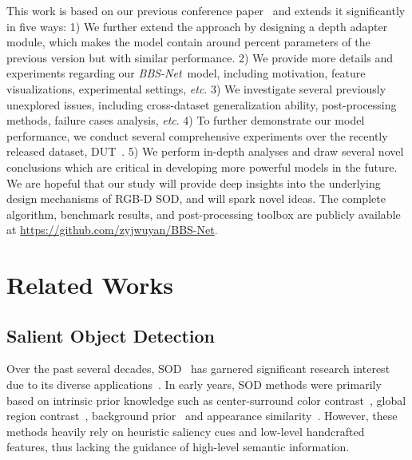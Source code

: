 \documentclass[journal]{IEEEtran}
\newcommand{\supp}[1]{\textcolor{magenta}{#1}}
\def\etc{\emph{etc}}
\def\ourmodel{\emph{BBS-Net}}
\begin{document}
This work is based on our previous conference paper~\cite{fan2020bbs} and extends it significantly in five ways:
1) We further extend the approach by designing a depth adapter module, which makes the model contain around  percent parameters of the previous version but with similar performance.
2) We provide more details and experiments regarding our \ourmodel~model, including motivation, feature visualizations, experimental settings, \etc.
3) We investigate several previously unexplored issues, including cross-dataset generalization ability, post-processing methods, failure cases analysis, \etc.
4) To further demonstrate our model performance, we conduct several comprehensive experiments over the recently released dataset, DUT~\cite{piao2019DMRA}. 
5) We perform in-depth analyses and draw several novel conclusions which are critical in developing more powerful models in the future. 
We are hopeful that our study will provide deep insights into the underlying design mechanisms of RGB-D SOD, and will spark novel ideas.
The complete algorithm, benchmark results, and post-processing toolbox are publicly available at \supp{\href{https://github.com/zyjwuyan/BBS-Net}{https://github.com/zyjwuyan/BBS-Net}.}

\vspace{-5pt}
\section{Related Works}\label{sec:related_works}

\vspace{-5pt}
\subsection{Salient Object Detection}\label{sec:sod}
\vspace{-5pt}
Over the past several decades, SOD~\cite{liu2010learning,achanta2009frequency,fan2018foreground} has garnered significant research interest due to its diverse applications~\cite{LiY16,ZhangWLWY17,zhao2020suppress}.
In early years, SOD methods were primarily based on intrinsic prior knowledge such as center-surround color contrast~\cite{itti1998model}, global region contrast~\cite{cheng2015GC}, background prior~\cite{li2015visual} and appearance similarity~\cite{cheng2013efficient}.
However, these methods heavily rely on heuristic saliency cues and low-level handcrafted features, thus lacking the guidance of high-level semantic information.\par 
\end{document}
